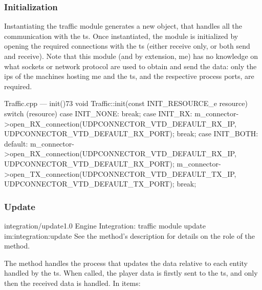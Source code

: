 \subsubsection{Initialization}

Instantiating the traffic module generates a new  object, that handles all the communication with the \gls{ts}. Once instantiated, the module is initialized by opening the required connections with the \gls{ts} (either receive only, or both send and receive). Note that this module (and by extension, \gls{me}) has no knowledge on what sockets or network protocol are used to obtain and send the data: only the \glspl{ip} of the machines hosting \gls{me} and the \gls{ts}, and the respective process ports, are required.

\begin{codelist}{Traffic.cpp --- init()}{73}
void Traffic::init(const INIT_RESOURCE_e resource) {
    switch (resource) {
        case INIT_NONE:
            break;
        case INIT_RX:
            m_connector->open_RX_connection(UDPCONNECTOR_VTD_DEFAULT_RX_IP, UDPCONNECTOR_VTD_DEFAULT_RX_PORT);
            break;
        case INIT_BOTH:
        default:
            m_connector->open_RX_connection(UDPCONNECTOR_VTD_DEFAULT_RX_IP, UDPCONNECTOR_VTD_DEFAULT_RX_PORT);
            m_connector->open_TX_connection(UDPCONNECTOR_VTD_DEFAULT_TX_IP, UDPCONNECTOR_VTD_DEFAULT_TX_PORT);
            break;
    }
}
\end{codelist}

\subsubsection{Update}

\begin{image}
	{integration/update}{1.0}
	{Engine Integration: traffic module update}
	{im:integration:update}
	{}
	{See the method's description for details on the role of the  method.}
\end{image}

The  method handles the process that updates the data relative to each entity handled by the \gls{ts}. When called, the player data is firstly sent to the \gls{ts}, and only then the received data is handled. In items:


